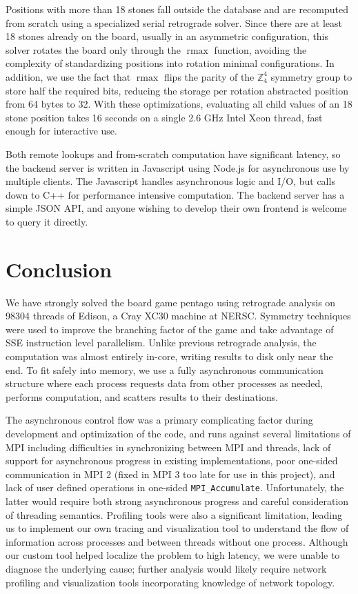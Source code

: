 \documentclass[conference]{IEEEtran}
\newcommand{\Z}{\mathbb{Z}}
\DeclareMathOperator{\rmax}{rmax}
\begin{document}
Positions with more than 18 stones fall outside the database and are recomputed from scratch using a specialized
serial retrograde solver.  Since there are at least 18 stones already on the board, usually in an asymmetric
configuration, this solver rotates the board only through the $\rmax$ function, avoiding the complexity of
standardizing positions into rotation minimal configurations.  In addition, we use the fact that $\rmax$ flips
the parity of the $\Z_4^4$ symmetry group to store half the required bits, reducing the storage per rotation
abstracted position from 64 bytes to 32.  With these optimizations, evaluating all child values of an 18
stone position takes 16 seconds on a single 2.6 GHz Intel Xeon thread, fast enough for interactive use.

Both remote lookups and from-scratch computation have significant latency, so the backend server is written
in Javascript using Node.js \cite{dahl2014nodejs} for asynchronous use by multiple clients.  The Javascript
handles asynchronous logic and I/O, but calls down to C++ for performance intensive computation.  The backend
server has a simple JSON API, and anyone wishing to develop their own frontend is welcome to query it directly.

\section{Conclusion}

We have strongly solved the board game pentago using retrograde analysis on 98304 threads of Edison, a
Cray XC30 machine at NERSC.  Symmetry techniques were used to improve the branching factor of the game
and take advantage of SSE instruction level parallelism.  Unlike previous retrograde analysis, the computation
was almost entirely in-core, writing results to disk only near the end.  To fit safely into
memory, we use a fully asynchronous communication structure where each process requests data from other
processes as needed, performs computation, and scatters results to their destinations.

The asynchronous control flow was a primary complicating factor during development and optimization of the
code, and runs against several limitations of MPI including difficulties in synchronizing between MPI and threads,
lack of support for asynchronous progress in existing implementations, poor one-sided communication in MPI 2
(fixed in MPI 3 too late for use in this project), and lack of user defined operations in one-sided
\verb+MPI_Accumulate+.  Unfortunately, the latter would require both strong asynchronous progress and careful
consideration of threading semantics.  Profiling tools were also a significant limitation, leading us to implement
our own tracing and visualization tool to understand the flow of information across processes and between threads
without one process.  Although our custom tool helped localize the problem to high latency, we were unable to
diagnose the underlying cause; further analysis would likely require network profiling and visualization tools
incorporating knowledge of network topology.
\end{document}
